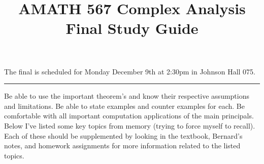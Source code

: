 \documentclass[10pt]{amsart}
\theoremstyle{nonumberplain}
\begin{document}
\pagestyle{empty}

\newcommand{\mline}{\vspace{.2in}\hrule\vspace{.2in}}


\title{\bf {AMATH 567 Complex Analysis Final Study Guide} }


\maketitle
\noindent
\begin{center}
The final is scheduled for Monday December 9th at 2:30pm in Johnson Hall 075.
\end{center}

\mline
\noindent
Be able to use the important theorem's and know their respective assumptions and limitations.
Be able to state examples and counter examples for each.
Be comfortable with all important computation applications of the main principals.
\\

\noindent
Below I've listed some key topics from memory (trying to force myself to recall).
Each of these should be supplemented by looking in the textbook, Bernard's notes, and homework assignments for more information related to the listed topics.
\\
\end{document}
